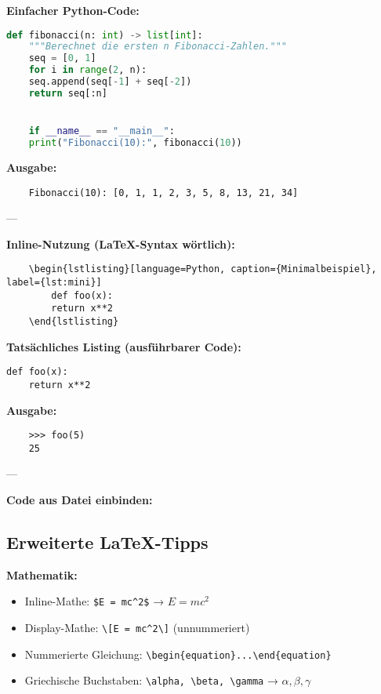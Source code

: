 \documentclass[11pt,a4paper]{article}
\begin{document}
\textbf{Einfacher Python-Code:}

\begin{lstlisting}[language=Python, caption={Fibonacci-Beispiel}, label={lst:fib}]
    def fibonacci(n: int) -> list[int]:
    """Berechnet die ersten n Fibonacci-Zahlen."""
    seq = [0, 1]
    for i in range(2, n):
    seq.append(seq[-1] + seq[-2])
    return seq[:n]


    if __name__ == "__main__":
    print("Fibonacci(10):", fibonacci(10))
\end{lstlisting}

\textbf{Ausgabe:}
\begin{verbatim}
    Fibonacci(10): [0, 1, 1, 2, 3, 5, 8, 13, 21, 34]
\end{verbatim}

---

\textbf{Inline-Nutzung (LaTeX-Syntax wörtlich):}
\begin{verbatim}
    \begin{lstlisting}[language=Python, caption={Minimalbeispiel}, label={lst:mini}]
        def foo(x):
        return x**2
    \end{lstlisting}
\end{verbatim}

\textbf{Tatsächliches Listing (ausführbarer Code):}
\begin{lstlisting}[caption={Minimalbeispiel}, label={lst:mini}]
    def foo(x):
    return x**2
\end{lstlisting}

\textbf{Ausgabe:}
\begin{verbatim}
    >>> foo(5)
    25
\end{verbatim}

    ---

    \textbf{Code aus Datei einbinden:}
    \lstinline[language=TeX]||




    \subsection*{Erweiterte LaTeX-Tipps}

    \textbf{Mathematik:}
    \begin{itemize}
        \item Inline-Mathe: \verb|$E = mc^2$| → $E = mc^2$
        \item Display-Mathe: \verb|\[E = mc^2\]| (unnummeriert)
        \item Nummerierte Gleichung: \verb|\begin{equation}...\end{equation}|
        \item Griechische Buchstaben: \verb|\alpha, \beta, \gamma| → $\alpha, \beta, \gamma$
    \end{itemize}
\end{document}
